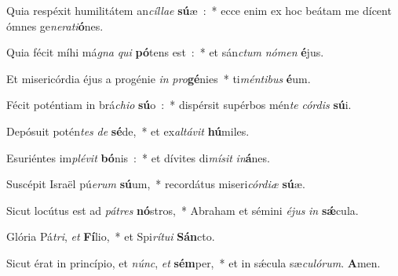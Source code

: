 ﻿\item Quia respéxit humilitátem an\emph{cíl}\-\emph{lae} \textbf{sú}\-æ~:~* ecce enim ex hoc beátam me dícent ómnes ge\emph{ne}\emph{ra}\emph{ti}\textbf{ó}nes.
\item Quia fécit míhi má\emph{gna} \emph{qui} \textbf{pó}\-tens est~:~* et sán\emph{ctum} \emph{nó}\-\emph{men} \textbf{é}jus.
\item Et misericórdia éjus a progénie \emph{in} \emph{pro}\-\textbf{gé}\-nies~* ti\emph{mén}\-\emph{ti}\-\emph{bus} \textbf{é}um.
\item Fécit poténtiam in brá\emph{chi}\-\emph{o} \textbf{sú}\-o~:~* dispérsit supérbos mén\emph{te} \emph{cór}\-\emph{dis} \textbf{sú}i.
\item Depósuit potén\emph{tes} \emph{de} \textbf{sé}\-de,~* et ex\emph{al}\-\emph{tá}\-\emph{vit} \textbf{hú}miles.
\item Esuriéntes im\emph{plé}\-\emph{vit} \textbf{bó}\-nis~:~* et dívites di\emph{mí}\-\emph{sit} \emph{in}\textbf{á}nes.
\item Suscépit Israël pú\emph{e}\-\emph{rum} \textbf{sú}\-um,~* recordátus miseri\emph{cór}\-\emph{di}\-\emph{æ} \textbf{sú}æ.
\item Sicut locútus est ad \emph{pá}\-\emph{tres} \textbf{nó}\-stros,~* Abraham et sémini \emph{é}\-\emph{jus} \emph{in} \textbf{sǽ}cula.
\item Glória Pá\emph{tri}, \emph{et} \textbf{Fí}\-lio,~* et Spi\emph{rí}\-\emph{tu}\-\emph{i} \textbf{Sán}cto.
\item Sicut érat in princípio, et \emph{núnc}, \emph{et} \textbf{sém}\-per,~* et in sǽcula sæ\emph{cu}\-\emph{ló}\-\emph{rum}. \textbf{A}men.
